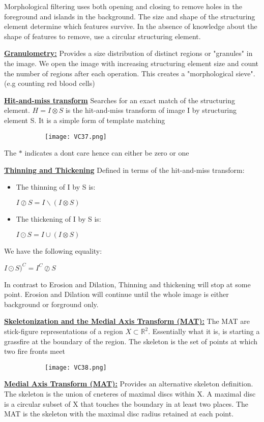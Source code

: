 \documentclass[8pt]{extreport}
\begin{document}
Morphological filtering uses both opening and closing to remove holes in the foreground and islands in the background. The size and shape of the structuring element determine which features survive. In the absence of knowledge about the shape of features to remove, use a circular structuring element.

\underline{\textbf{Granulometry:}} Provides a size distribution of distinct regions or "granules" in the image. We open the image with increasing structuring element size and count the number of regions after each operation. This creates a "morphological sieve". (e.g counting red blood cells)

\underline{\textbf{Hit-and-miss transform}} Searches for an exact match of the structuring element. $H = I \otimes S$ is the hit-and-miss transform of image I by structuring element S. It is a simple form of template matching
\begin{figure}[H]
\centering
\begin{subfigure}[b]{0.32\linewidth}
\texttt{[image: VC37.png]}
\end{subfigure}
\end{figure}
The $*$ indicates a dont care hence can either be zero or one

\underline{\textbf{Thinning and Thickening}} Defined in terms of the hit-and-miss transform:
\begin{itemize}
\item The thinning of I by S is:
\begin{center}
$ I \oslash S = I\backslash (I \otimes S)$
\end{center}
\item The thickening of I by S is:
\begin{center}
$ I \odot S = I \cup (I \otimes S)$
\end{center}
\end{itemize}
We have the following equality:
\begin{center}
$I \odot S)^C = I^C \oslash S$
\end{center}
In contrast to Erosion and Dilation, Thinning and thickening will stop at some point. Erosion and Dilation will continue until the whole image is either background or forground only. 

\underline{\textbf{Skeletonization and the Medial Axis Transform (MAT):}} The MAT are stick-figure representations of a region $X \subset \mathbb{R}^2$. Essentially what it is, is starting a grassfire at the boundary of the region. The skeleton is the set of points at which two fire fronts meet
\begin{figure}[H]
\centering
\begin{subfigure}[b]{0.32\linewidth}
\texttt{[image: VC38.png]}
\end{subfigure}
\end{figure}
\underline{\textbf{Medial Axis Transform (MAT):}} Provides an alternative skeleton definition. The skeleton is the union of cneteres of maximal discs within X. A maximal disc is a circular subset of X that touches the boundary in at least two places. The MAT is the skeleton with the maximal disc radius retained at each point.
\end{document}
